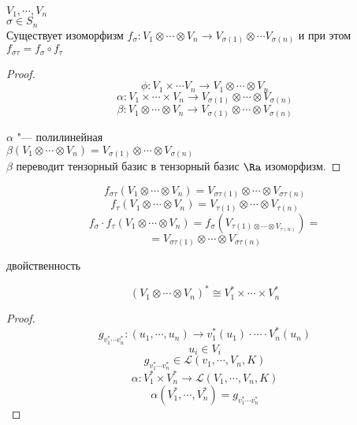 \begin{theorem}
$V_1, \cdots, V_n$\\
$\sigma \in S_n$\\
Существует изоморфизм $f_{\sigma}\colon V_1 \otimes \cdots \otimes V_n \to V_{\sigma(1)} \otimes \cdots V_{\sigma(n)}$
и при этом  $f_{\sigma \tau} = f_{\sigma} \circ f_{\tau}$
\end{theorem}
\begin{proof}
$$\phi \colon V_1 \times \cdots V_n \to V_1 \otimes \cdots \otimes V_n$$
$$\alpha \colon V_1 \times \cdots \times V_n \to V_{\sigma(1)} \otimes \cdots \otimes V_{\sigma(n)}$$
$$\beta \colon V_1 \otimes \cdots \otimes V_n \to V_{\sigma(1)} \otimes \cdots \otimes V_{\sigma(n)}$$

$\alpha$ "--- полилинейная \\
$\beta(V_1 \otimes \cdots \otimes V_n) = V_{\sigma(1)} \otimes \cdots \otimes V_{\sigma(n)}$\\
$\beta$ переводит тензорный базис в тензорный базис $\Ra$ изоморфизм.
\end{proof}

$$f_{\sigma \tau}(V_1 \otimes \cdots \otimes V_n) = V_{\sigma\tau(1)} \otimes \cdots \otimes V_{\sigma \tau(n)}$$
$$f_{\tau}(V_1 \otimes \cdots \otimes V_n) = V_{\tau(1)} \otimes \cdots \otimes V_{\tau(n)} $$
$$f_{\sigma}\cdot f_{\tau}(V_1 \otimes \cdots \otimes V_n) = f_{\sigma}(V_{\tau(1) \otimes \cdots \otimes V_{\tau(n)}}) =$$
$$= V_{\sigma\tau(1)} \otimes \cdots \otimes V_{\sigma \tau(n)}$$

\begin{theorem}{двойственность}

$$(V_1 \otimes \cdots \otimes V_n)^* \cong V_1^* \times \cdots \times V_n^*$$

\end{theorem}
\begin{proof}
$$g_{v_1^* \cdots v_n^*} \colon (u_1, \cdots, u_n) \to v_1^*(u_1) \cdot \cdots \cdot V_n^*(u_n)$$
$$u_i \in V_i$$
$$g_{v_1^* \cdots v_n^*} \in \mathcal{L}(v_1, \cdots, V_n, K) $$
$$\alpha \colon V_1^* \times V_n^* \to \mathcal{L}(V_1, \cdots, V_n, K) $$
$$\alpha(V_1^*, \cdots, V_n^*) = g_{v_1^* \cdots v_n^*} $$
\end{proof}

